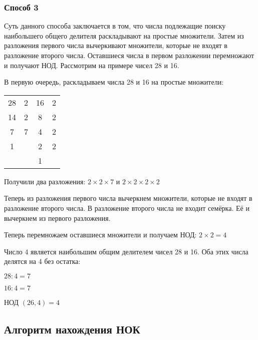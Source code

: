 \documentclass[12pt]{article}
\begin{document}
    \subsubsection{Способ 3}
    Суть данного способа заключается в том, что числа подлежащие поиску наибольшего общего делителя раскладывают на простые множители. Затем из разложения первого числа вычеркивают множители, которые не входят в разложение второго числа. Оставшиеся числа в первом разложении перемножают и получают НОД. Рассмотрим на примере чисел 28 и 16.\par
    В первую очередь, раскладываем числа 28 и 16 на простые множители:\par
    \begin{tabular}{c|cc|c}
        28 & 2 & 16 & 2 \\
        14 & 2 & 8 & 2 \\
        7 & 7 & 4 & 2 \\
        1 & & 2 & 2 \\
        & & 1 
    \end{tabular}\par
    Получили два разложения: $2 \times 2 \times 7$ и $2 \times 2 \times 2 \times 2$\par
    Теперь из разложения первого числа вычеркнем множители, которые не входят в разложение второго числа. В разложение второго числа не входит семёрка. Её и вычеркнем из первого разложения.\par
    Теперь перемножаем оставшиеся множители и получаем НОД: $2 \times 2 = 4$\par
    Число 4 является наибольшим общим делителем чисел 28 и 16. Оба этих числа делятся на 4 без остатка:\par
    $28 : 4 = 7$\par
    $16 : 4 = 7$\par
    НОД $(26,4)=4$\par

    \subsection{Алгоритм нахождения НОК}
\end{document}
